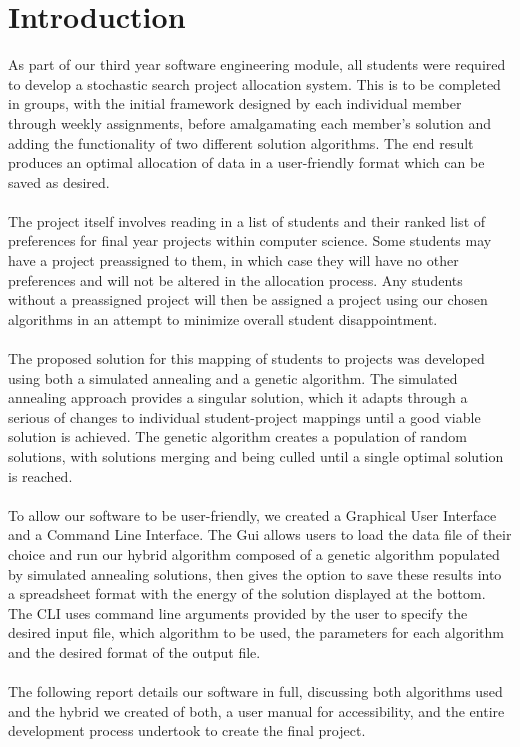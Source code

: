 \documentclass{article}
\newcommand{\enterProblemHeader}[1]{
\nobreak\extramarks{#1}{#1}\nobreak
\nobreak\extramarks{#1}{#1}\nobreak
}
\newcommand{\exitProblemHeader}[1]{
\nobreak\extramarks{#1}{#1 continued on next page\ldots}\nobreak
\nobreak\extramarks{#1}{}\nobreak
}
\newcounter{homeworkProblemCounter} %
\newcommand{\homeworkProblemName}{}
\newenvironment{homeworkProblem}[1][
 \arabic{homeworkProblemCounter}]{ %
\stepcounter{homeworkProblemCounter} %
\renewcommand{\homeworkProblemName}{#1} %
\section{\homeworkProblemName} %
\enterProblemHeader{} %
}{
\exitProblemHeader{} %
}
\begin{document}
\begin{homeworkProblem}[Introduction]
\vspace{0.5cm}
As part of our third year software engineering module, all students were required to develop a stochastic search project allocation system. This is to be completed in groups,  with the initial framework designed by each individual member through weekly assignments, before amalgamating each member's solution and adding the functionality of two different solution algorithms. The end result produces an optimal allocation of data in a user-friendly format which can be saved as desired.
\\\\
The project itself involves reading in a list of students and their ranked list of preferences for final year projects within computer science. Some students may have a project preassigned to them, in which case they will have no other preferences and will not be altered in the allocation process. Any students without a preassigned project will then be assigned a project using our chosen algorithms in an attempt to minimize overall student disappointment. 
\\\\
The proposed solution for this mapping of students to projects was developed using both a simulated annealing and a genetic algorithm. The simulated annealing approach provides a singular solution, which it adapts through a serious of changes to individual student-project mappings until a good viable solution is achieved. The genetic algorithm creates a population of random solutions, with solutions merging and being culled until a single optimal solution is reached. 
\\\\
To allow our software to be user-friendly, we created a Graphical User Interface and a Command Line Interface. The Gui allows users to load the data file of their choice and run our hybrid algorithm composed of a genetic algorithm populated by simulated annealing solutions, then gives the option to save these results into a spreadsheet format with the energy of the solution displayed at the bottom. The CLI uses command line arguments provided by the user to specify the desired input file, which algorithm to be used, the parameters for each algorithm and the desired format of the output file.
\\\\
The following report details our software in full, discussing both algorithms used and the hybrid we created of both, a user manual for accessibility, and the entire development process undertook to create the final project.









\end{homeworkProblem}
\newpage
\end{document}
